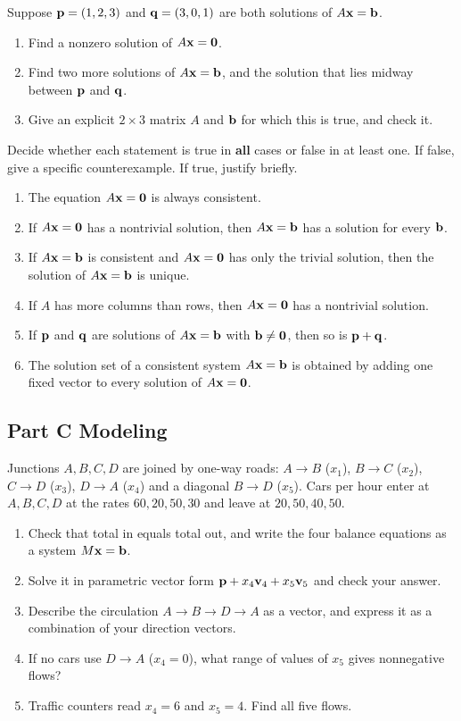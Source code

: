 \documentclass[11pt]{article}
\begin{document}
Suppose $\mathbf{p}=(1,2,3)$ and $\mathbf{q}=(3,0,1)$ are both solutions of $A\mathbf{x}=\mathbf{b}$.
\begin{enumerate}
  \item Find a nonzero solution of $A\mathbf{x}=\mathbf{0}$.
  \item Find two more solutions of $A\mathbf{x}=\mathbf{b}$, and the solution that lies midway between $\mathbf{p}$ and $\mathbf{q}$.
  \item Give an explicit $2\times3$ matrix $A$ and $\mathbf{b}$ for which this is true, and check it.
\end{enumerate}

Decide whether each statement is true in \textbf{all} cases or false in at least one. If false, give a specific counterexample. If true, justify briefly.
\begin{enumerate}
  \item The equation $A\mathbf{x}=\mathbf{0}$ is always consistent.
  \item If $A\mathbf{x}=\mathbf{0}$ has a nontrivial solution, then $A\mathbf{x}=\mathbf{b}$ has a solution for every $\mathbf{b}$.
  \item If $A\mathbf{x}=\mathbf{b}$ is consistent and $A\mathbf{x}=\mathbf{0}$ has only the trivial solution, then the solution of $A\mathbf{x}=\mathbf{b}$ is unique.
  \item If $A$ has more columns than rows, then $A\mathbf{x}=\mathbf{0}$ has a nontrivial solution.
  \item If $\mathbf{p}$ and $\mathbf{q}$ are solutions of $A\mathbf{x}=\mathbf{b}$ with $\mathbf{b}\neq\mathbf{0}$, then so is $\mathbf{p}+\mathbf{q}$.
  \item The solution set of a consistent system $A\mathbf{x}=\mathbf{b}$ is obtained by adding one fixed vector to every solution of $A\mathbf{x}=\mathbf{0}$.
\end{enumerate}

\subsection*{Part C \quad Modeling}

Junctions $A,B,C,D$ are joined by one-way roads: $A\to B$ ($x_1$), $B\to C$ ($x_2$), $C\to D$ ($x_3$), $D\to A$ ($x_4$) and a diagonal $B\to D$ ($x_5$). Cars per hour enter at $A,B,C,D$ at the rates $60,20,50,30$ and leave at $20,50,40,50$.
\begin{enumerate}
  \item Check that total in equals total out, and write the four balance equations as a system $M\mathbf{x}=\mathbf{b}$.
  \item Solve it in parametric vector form $\mathbf{p}+x_4\mathbf{v}_4+x_5\mathbf{v}_5$ and check your answer.
  \item Describe the circulation $A\to B\to D\to A$ as a vector, and express it as a combination of your direction vectors.
  \item If no cars use $D\to A$ ($x_4=0$), what range of values of $x_5$ gives nonnegative flows?
  \item Traffic counters read $x_4=6$ and $x_5=4$. Find all five flows.
\end{enumerate}
\end{document}
